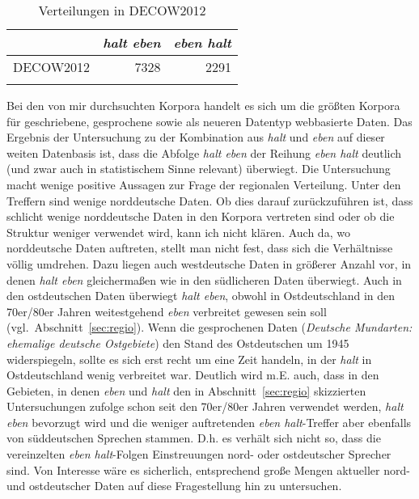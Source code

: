 \begin{table}
\caption{\label{tab:625}Verteilungen in DECOW2012}
     \begin{tabular}[t]{lrr}
     \lsptoprule
     & \textit{halt eben} & \textit{eben halt}\\\midrule
     DECOW2012 & 7328 & 2291\\
     \lspbottomrule
     \end{tabular}
\end{table}
Bei den von mir durchsuchten Korpora handelt es sich um die größten Korpora für geschriebene, gesprochene sowie als neueren Datentyp webbasierte Daten. Das Ergebnis der Untersuchung zu der Kombination aus \textit{halt} und \textit{eben} auf dieser weiten Datenbasis ist, dass die Abfolge \textit{halt eben} der Reihung \textit{eben halt} deutlich (und zwar auch in statistischem Sinne relevant) überwiegt. Die Untersuchung macht wenige positive Aussagen zur Frage der regionalen Verteilung. Unter den Treffern sind wenige norddeutsche Daten. Ob dies darauf zurückzuführen ist, dass schlicht wenige norddeutsche Daten in den Korpora vertreten sind oder ob die Struktur weniger verwendet wird, kann ich nicht klären. Auch da, wo norddeutsche Daten auftreten, stellt man nicht fest, dass sich die Verhältnisse völlig umdrehen. Dazu liegen auch westdeutsche Daten in größerer Anzahl vor, in denen \textit{halt eben} gleichermaßen wie in den südlicheren Daten überwiegt. Auch in den ostdeutschen Daten überwiegt \textit{halt eben}, obwohl in Ostdeutschland in den 70er/80er Jahren weitestgehend \textit{eben} verbreitet gewesen sein soll (vgl.\ Abschnitt~\ref{sec:regio}). Wenn die gesprochenen Daten (\textit{Deutsche Mundarten: ehemalige deutsche Ostgebiete}) den Stand des Ostdeutschen um 1945 widerspiegeln, sollte es sich erst recht um eine Zeit handeln, in der \textit{halt} in Ostdeutschland wenig verbreitet war. Deutlich wird m.E. auch, dass in den Gebieten, in denen \textit{eben} und \textit{halt} den in Abschnitt~\ref{sec:regio} skizzierten Untersuchungen zufolge schon seit den 70er\slash 80er Jahren verwendet werden, \textit{halt eben} bevorzugt wird und die weniger auftretenden \textit{eben halt}-Treffer aber ebenfalls von süddeutschen Sprechen stammen. D.h. es verhält sich nicht so, dass die vereinzelten \textit{eben halt}-Folgen Einstreuungen nord- oder ostdeutscher Sprecher sind. Von Interesse wäre es sicherlich, entsprechend große Mengen aktueller nord- und ostdeutscher Daten auf diese Fragestellung hin zu untersuchen. 

